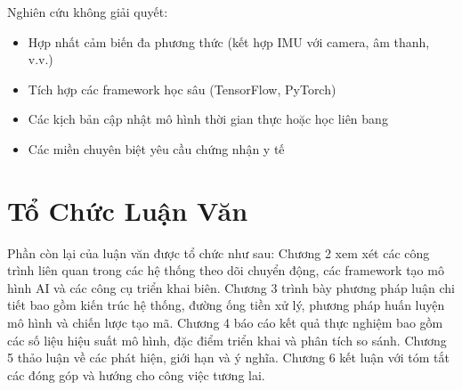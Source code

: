 Nghiên cứu không giải quyết:

\begin{itemize}
\item Hợp nhất cảm biến đa phương thức (kết hợp IMU với camera, âm thanh, v.v.)
\item Tích hợp các framework học sâu (TensorFlow, PyTorch)
\item Các kịch bản cập nhật mô hình thời gian thực hoặc học liên bang
\item Các miền chuyên biệt yêu cầu chứng nhận y tế
\end{itemize}

\section{Tổ Chức Luận Văn}

Phần còn lại của luận văn được tổ chức như sau: Chương 2 xem xét các công trình liên quan trong các hệ thống theo dõi chuyển động, các framework tạo mô hình AI và các công cụ triển khai biên. Chương 3 trình bày phương pháp luận chi tiết bao gồm kiến trúc hệ thống, đường ống tiền xử lý, phương pháp huấn luyện mô hình và chiến lược tạo mã. Chương 4 báo cáo kết quả thực nghiệm bao gồm các số liệu hiệu suất mô hình, đặc điểm triển khai và phân tích so sánh. Chương 5 thảo luận về các phát hiện, giới hạn và ý nghĩa. Chương 6 kết luận với tóm tắt các đóng góp và hướng cho công việc tương lai.
